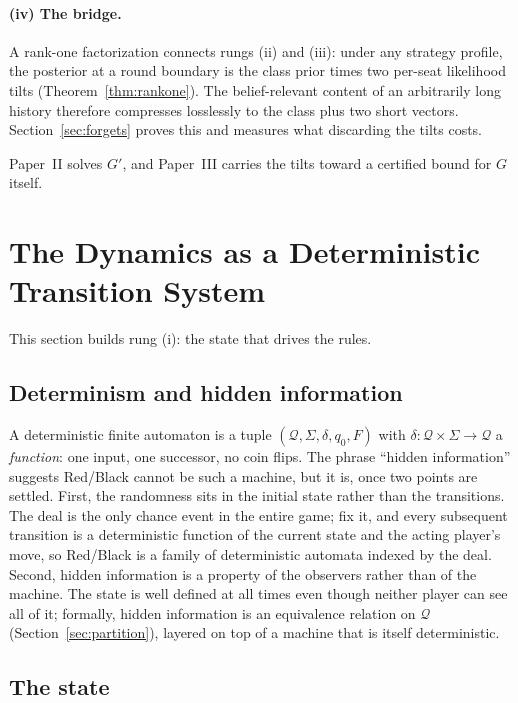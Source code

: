 \documentclass[11pt]{article}
\theoremstyle{plain}
\theoremstyle{definition}
\theoremstyle{remark}
\newcommand{\Q}{\ensuremath{\mathcal{Q}}}
\newcommand{\Sig}{\ensuremath{\Sigma}}
\newcommand{\dtrans}{\ensuremath{\delta}}
\begin{document}
\paragraph{(iv) The bridge.} A rank-one factorization connects rungs (ii)
and (iii): under any strategy profile, the posterior at a round boundary is
the class prior times two per-seat likelihood tilts
(Theorem~\ref{thm:rankone}). The belief-relevant content of an arbitrarily
long history therefore compresses losslessly to the class plus two short
vectors. Section~\ref{sec:forgets} proves this and measures what
discarding the tilts costs.

Paper~II solves $G'$, and Paper~III carries the tilts toward a certified
bound for $G$ itself.

\section{The Dynamics as a Deterministic Transition System}
\label{sec:automaton}

This section builds rung (i): the state that drives the rules.

\subsection{Determinism and hidden information}

A deterministic finite automaton is a tuple $(\Q,\Sig,\dtrans,q_0,F)$ with
$\dtrans:\Q\times\Sig\to\Q$ a \emph{function}: one input, one successor, no
coin flips. The phrase ``hidden information'' suggests Red/Black cannot be
such a machine, but it is, once two points are settled. First, the
randomness sits in the initial state rather than the transitions. The deal
is the only chance event in the entire game; fix it, and every subsequent
transition is a deterministic function of the current state and the acting
player's move, so Red/Black is a family of deterministic automata indexed
by the deal. Second, hidden information is a property of the observers
rather than of the machine. The state is well defined at all times even
though neither player can see all of it; formally, hidden information is an
equivalence relation on $\Q$ (Section~\ref{sec:partition}), layered on top
of a machine that is itself deterministic.

\subsection{The state}
\end{document}
